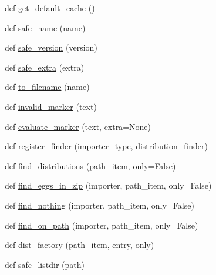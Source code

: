 \begin{DoxyCompactItemize}
\item 
def \hyperlink{namespacepip_1_1__vendor_1_1pkg__resources_a089c598fc768861704677fbf9d3834ca}{get\+\_\+default\+\_\+cache} ()
\item 
def \hyperlink{namespacepip_1_1__vendor_1_1pkg__resources_a70f3daf45932e9f787aa6328ef15c4d0}{safe\+\_\+name} (name)
\item 
def \hyperlink{namespacepip_1_1__vendor_1_1pkg__resources_a5dd62b1a3d1156091d9f74bdaf18357f}{safe\+\_\+version} (version)
\item 
def \hyperlink{namespacepip_1_1__vendor_1_1pkg__resources_a0fca90e72770561adb5c1feb0ebfd60d}{safe\+\_\+extra} (extra)
\item 
def \hyperlink{namespacepip_1_1__vendor_1_1pkg__resources_a8984c165a48e88fd761aded34bc3290e}{to\+\_\+filename} (name)
\item 
def \hyperlink{namespacepip_1_1__vendor_1_1pkg__resources_af839e556aca0d802756e520c15420a81}{invalid\+\_\+marker} (text)
\item 
def \hyperlink{namespacepip_1_1__vendor_1_1pkg__resources_a8ceda07b502eb64c69b1dd9c1ceaae91}{evaluate\+\_\+marker} (text, extra=None)
\item 
def \hyperlink{namespacepip_1_1__vendor_1_1pkg__resources_a01f6ac4d5a90eed912836743a7dedbc8}{register\+\_\+finder} (importer\+\_\+type, distribution\+\_\+finder)
\item 
def \hyperlink{namespacepip_1_1__vendor_1_1pkg__resources_a9f1ced181efd53ae61e5cadb9cff8dbe}{find\+\_\+distributions} (path\+\_\+item, only=False)
\item 
def \hyperlink{namespacepip_1_1__vendor_1_1pkg__resources_a16265aa2ff58ff32bb6dff99d0459f6e}{find\+\_\+eggs\+\_\+in\+\_\+zip} (importer, path\+\_\+item, only=False)
\item 
def \hyperlink{namespacepip_1_1__vendor_1_1pkg__resources_a06361cf701f70db5aeed4a4b121fbb31}{find\+\_\+nothing} (importer, path\+\_\+item, only=False)
\item 
def \hyperlink{namespacepip_1_1__vendor_1_1pkg__resources_a8031e03c5da8873c261a7cc9c7dfe665}{find\+\_\+on\+\_\+path} (importer, path\+\_\+item, only=False)
\item 
def \hyperlink{namespacepip_1_1__vendor_1_1pkg__resources_a40ecc69f1bfb2ad4d6b126f1ffe89249}{dist\+\_\+factory} (path\+\_\+item, entry, only)
\item 
def \hyperlink{namespacepip_1_1__vendor_1_1pkg__resources_a58ffc9484616bc8036f165b155a84a89}{safe\+\_\+listdir} (path)
\item 

\end{DoxyCompactItemize}
